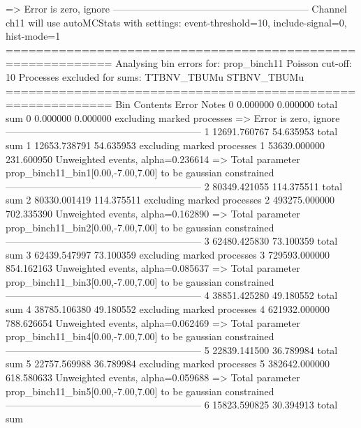   => Error is zero, ignore      
------------------------------------------------------------
Channel ch11 will use autoMCStats with settings: event-threshold=10, include-signal=0, hist-mode=1
============================================================
Analysing bin errors for: prop_binch11
Poisson cut-off: 10
Processes excluded for sums: TTBNV_TBUMu STBNV_TBUMu
============================================================
Bin        Contents        Error           Notes                         
0          0.000000        0.000000        total sum                     
0          0.000000        0.000000        excluding marked processes    
  => Error is zero, ignore      
------------------------------------------------------------
1          12691.760767    54.635953       total sum                     
1          12653.738791    54.635953       excluding marked processes    
1          53639.000000    231.600950      Unweighted events, alpha=0.236614
  => Total parameter prop_binch11_bin1[0.00,-7.00,7.00] to be gaussian constrained
------------------------------------------------------------
2          80349.421055    114.375511      total sum                     
2          80330.001419    114.375511      excluding marked processes    
2          493275.000000   702.335390      Unweighted events, alpha=0.162890
  => Total parameter prop_binch11_bin2[0.00,-7.00,7.00] to be gaussian constrained
------------------------------------------------------------
3          62480.425830    73.100359       total sum                     
3          62439.547997    73.100359       excluding marked processes    
3          729593.000000   854.162163      Unweighted events, alpha=0.085637
  => Total parameter prop_binch11_bin3[0.00,-7.00,7.00] to be gaussian constrained
------------------------------------------------------------
4          38851.425280    49.180552       total sum                     
4          38785.106380    49.180552       excluding marked processes    
4          621932.000000   788.626654      Unweighted events, alpha=0.062469
  => Total parameter prop_binch11_bin4[0.00,-7.00,7.00] to be gaussian constrained
------------------------------------------------------------
5          22839.141500    36.789984       total sum                     
5          22757.569988    36.789984       excluding marked processes    
5          382642.000000   618.580633      Unweighted events, alpha=0.059688
  => Total parameter prop_binch11_bin5[0.00,-7.00,7.00] to be gaussian constrained
------------------------------------------------------------
6          15823.590825    30.394913       total sum                     

